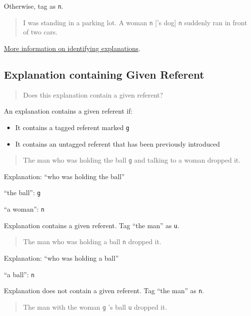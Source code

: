\documentclass[
]{book}
\providecommand{\tightlist}{%
  \setlength{\itemsep}{0pt}\setlength{\parskip}{0pt}}
\begin{document}
Otherwise, tag as \texttt{n}.

\begin{quote}
I was standing in a parking lot. A woman \texttt{n} {[}'s dog{]} \texttt{n} suddenly ran in front of two cars.
\end{quote}

\protect\hyperlink{referent-explanation-test}{More information on identifying explanations}.

\hypertarget{explanation-containing-given-referent}{%
\subsection{Explanation containing Given Referent}\label{explanation-containing-given-referent}}

\begin{quote}
Does this explanation contain a given referent?
\end{quote}

An explanation contains a given referent if:

\begin{itemize}
\tightlist
\item
  It contains a tagged referent marked \texttt{g}
\item
  It contains an untagged referent that has been previously introduced
\end{itemize}

\begin{quote}
The man who was holding the ball \texttt{g} and talking to a woman dropped it.
\end{quote}

Explanation: ``who was holding the ball''

``the ball'': \texttt{g}

``a woman'': \texttt{n}

Explanation contains a given referent.
Tag ``the man'' as \texttt{u}.

\begin{quote}
The man who was holding a ball \texttt{n} dropped it.
\end{quote}

Explanation: ``who was holding a ball''

``a ball'': \texttt{n}

Explanation does not contain a given referent.
Tag ``the man'' as \texttt{n}.

\begin{quote}
The man with the woman \texttt{g} 's ball \texttt{u} dropped it.
\end{quote}
\end{document}

